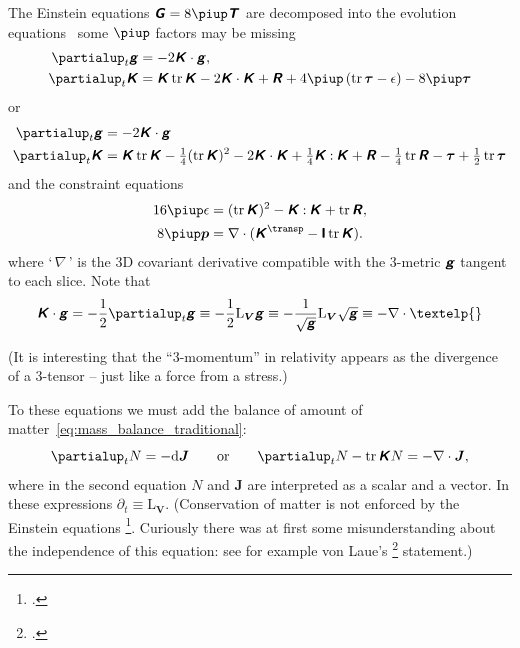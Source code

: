 \documentclass[\ifafour a4paper,12pt,\else a5paper,10pt,\fi%
onecolumn,oneside,article,%
british%
]{memoir}
\newcommand*{\defquote}[1]{`\,#1\,'}
\theoremstyle{remark}
\theoremstyle{innote}
\newcommand*{\mathte}[1]{\textbf{\textit{\textsf{#1}}}}
\newcommand*{\citep}{\footcites}
\newcommand*{\de}{\partialup}%
\newcommand*{\pu}{\piup}%
\newcommand*{\di}{\mathrm{d}}%
\DeclareMathOperator{\tr}{tr}%
\newcommand*{\con}{\mathbin{:}}%
\renewcommand*{\|}[1][]{\nonscript\,#1\vert\nonscript\;\mathopen{}}
\newcommand*{\sect}{\S}%
\newcommand*{\eg}{{e.g.}}
\newcommand*{\T}{^\transp}%
\newcommand*{\wrench}{{\fontencoding{U}\fontfamily{fontawesomethree}\selectfont\symbol{114}}}
\newcommand{\mynote}[1]{ {\color{notecolour}\wrench\ #1}}
\newcommand*{\Li}{\mathrm{L}}
\newcommand*{\yd}{N}
\newcommand*{\yjj}{J}
\newcommand*{\yj}{\bm{\yjj}}
\newcommand*{\yGG}{G}
\newcommand*{\yG}{\mathte{\yGG}}
\newcommand*{\yTT}{\tau}
\newcommand*{\yT}{\bm{\yTT}}
\newcommand*{\yTTf}{T}
\newcommand*{\yTf}{\mathte{\yTTf}}
\newcommand*{\ynn}{V}
\newcommand*{\yn}{\bm{\ynn}}
\newcommand*{\ygg}{g}
\newcommand*{\yg}{\mathte{\ygg}}
\newcommand*{\yKK}{K}
\newcommand*{\yK}{\mathte{\yKK}}
\newcommand*{\yRR}{R}
\newcommand*{\yR}{\mathte{\yRR}}
\newcommand*{\ypp}{p}
\newcommand*{\yp}{\bm{\ypp}}
\newcommand*{\ye}{\epsilon}
\newcommand*{\ynab}{\nabla}
\newcommand*{\yI}{\textsf{\textbf{I}}}
\begin{document}
The Einstein equations $\yG = 8\pu\yTf$ are decomposed into the evolution
equations \mynote{some $\pu$ factors may be missing}
\begin{subequations}\label{eq:evolution_eqns}
  \begin{align}
    \label{eq:dt_metric}
    \de_t \yg &= -2\yK\cdot\yg,
    \\
    \label{eq:dt_curvat}
    \de_t \yK &=  \yK\tr\yK -2 \yK\cdot\yK +\yR + 4\pu\,(\tr\yT-\ye) - 8\pu\yT
  \end{align}
\end{subequations}
or
\begin{subequations}\label{eq:evolution_eqns2}
  \begin{align}
    \label{eq:dt_metric2}
    \de_t \yg &= -2\yK\cdot\yg
    \\
    \label{eq:dt_curvat2}
    \de_t \yK &=  \yK\tr\yK-\tfrac{1}{4}(\tr\yK)^2
                -2 \yK\cdot\yK + \tfrac{1}{4}\yK\con\yK
                +\yR -\tfrac{1}{4}\tr\yR
                -\yT+ \tfrac{1}{2}\tr\yT
  \end{align}
\end{subequations}
and the constraint equations
\begin{subequations}\label{eq:constraint_eqns}
  \begin{align}
    \label{eq:energy_constraint}
    16\pu\ye &=(\tr\yK)^2 - \yK\con\yK + \tr\yR,
    \\
    \label{eq:momentum_constraint}
    8\pu\yp &= \ynab\cdot(\yK\T - \yI\tr\yK).
  \end{align}
\end{subequations}
where \defquote{$\ynab$} is the 3D covariant derivative compatible with the
3-metric $\yg$ tangent to each slice. Note that
\begin{equation}
  \label{eq:curvature_stretching}
  \yK\cdot\yg = -\frac{1}{2}\de_t\yg \equiv
  -\frac{1}{2}  \Li_{\yn}\yg \equiv
  -\frac{1}{\sqrt{\yg}}\Li_{\yn}\sqrt{\yg} \equiv -\ynab\cdot \textelp{}
\end{equation}

(It is interesting that the \enquote{3-momentum} in relativity appears as
the divergence of a 3-tensor -- just like a force from a stress.)

To these equations we must add the balance of amount of
matter~\eqref{eq:mass_balance_traditional}:
\begin{equation}
  \label{eq:mass_balance_gen-rel}
  \de_t\yd = - \di\yj
  \qquad\text{or}\qquad
  \de_t\yd -\tr\yK\yd = -\ynab\cdot\yj,
\end{equation}
where in the second equation $\yd$ and $\yj$ are interpreted as a scalar
and a vector. In these expressions $\de_t \equiv \Li_{\yn}$. (Conservation
of matter is not enforced by the Einstein equations
\citep[\eg][]{eckart1940c}[\sect~6.3.2]{gourgoulhon2007_r2012}[\sect~5.2]{baumgarteetal2010}[\sect~7.3]{rezzollaetal2013}[\sect~22.2]{misneretal1970_r1973}.
Curiously there was at first some misunderstanding about the independence
of this equation: see for example von Laue's \citep[p.~503]{vonlaue1949}
statement.)
\end{document}
